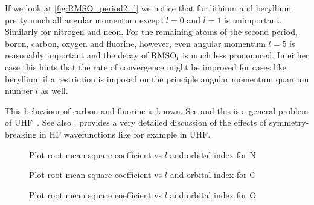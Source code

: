 If we look at \vref{fig:RMSO_period2_l} we notice
that for lithium and beryllium pretty much all angular momentum
except $l = 0$ and $l = 1$ is unimportant.
Similarly for nitrogen and neon.
For the remaining atoms of the second period,
boron, carbon, oxygen and fluorine, however,
even angular momentum $l=5$ is reasonably important and the
decay of $\text{RMSO}_l$ is much less pronounced.
In either case this hints that the rate of convergence might
be improved for cases like beryllium
if a restriction is imposed on the principle angular momentum
quantum number $l$ as well.

This behaviour of carbon and fluorine is known.
See \citet{Cook1981}
and this is a general problem of UHF~\citet{Cook1984}.
See also \citet{McWeeny1985}.
\citet{Fukutome1981} provides a very detailed discussion of the
effects of symmetry-breaking in HF wavefunctions like for example in UHF.





\begin{figure}
	\centering
	\caption{Plot root mean square coefficient vs $l$ and orbital index for N}
	\label{fig:RMSLF_N}
\end{figure}

\begin{figure}
	\centering
	\caption{Plot root mean square coefficient vs $l$ and orbital index for C}
	\label{fig:RMSLF_C}
\end{figure}

\begin{figure}
	\centering
	\caption{Plot root mean square coefficient vs $l$ and orbital index for O}
	\label{fig:RMSLF_O}
\end{figure}

